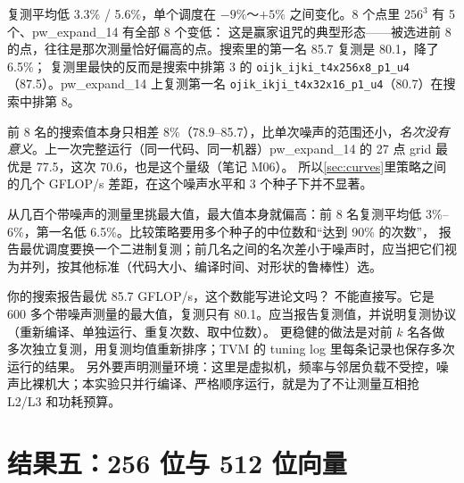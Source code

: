 \documentclass[11pt,a4paper]{ctexart}
\newcommand{\sk}[1]{\texttt{#1}}
\begin{document}
复测平均低 3.3\% / 5.6\%，单个调度在 $-9\%$～$+5\%$ 之间变化。8 个点里 $256^3$ 有 5 个、pw\_expand\_14 有全部 8 个变低：
这是赢家诅咒的典型形态——被选进前 8 的点，往往是那次测量恰好偏高的点。搜索里的第一名 85.7 复测是 80.1，降了 6.5\%；
复测里最快的反而是搜索中排第 3 的 \sk{oijk\_ijki\_t4x256x8\_p1\_u4}（87.5）。pw\_expand\_14 上复测第一名 \sk{ojik\_ikji\_t4x32x16\_p1\_u4}（80.7）在搜索中排第 8。

前 8 名的搜索值本身只相差 8\%（78.9--85.7），比单次噪声的范围还小，\emph{名次没有意义}。上一次完整运行（同一代码、同一机器）pw\_expand\_14 的 27 点 grid 最优是 77.5，这次 70.6，也是这个量级（笔记 M06）。
所以\cref{sec:curves}里策略之间的几个 GFLOP/s 差距，在这个噪声水平和 3 个种子下并不显著。

\begin{findingbox}[：报告最优值之前必须复测]
从几百个带噪声的测量里挑最大值，最大值本身就偏高：前 8 名复测平均低 3\%--6\%，第一名低 6.5\%。比较策略要用多个种子的中位数和“达到 90\% 的次数”，
报告最优调度要换一个二进制复测；前几名之间的名次差小于噪声时，应当把它们视为并列，按其他标准（代码大小、编译时间、对形状的鲁棒性）选。
\end{findingbox}

\begin{iqbox}{你的搜索报告最优 85.7 GFLOP/s，这个数能写进论文吗？}
不能直接写。它是 600 多个带噪声测量的最大值，复测只有 80.1。应当报告复测值，并说明复测协议（重新编译、单独运行、重复次数、取中位数）。
更稳健的做法是对前 $k$ 名各做多次独立复测，用复测均值重新排序；TVM 的 tuning log 里每条记录也保存多次运行的结果。
另外要声明测量环境：这里是虚拟机，频率与邻居负载不受控，噪声比裸机大；本实验只并行编译、严格顺序运行，就是为了不让测量互相抢 L2/L3 和功耗预算。
\end{iqbox}

\section{结果五：256 位与 512 位向量}\label{sec:width}
\end{document}

